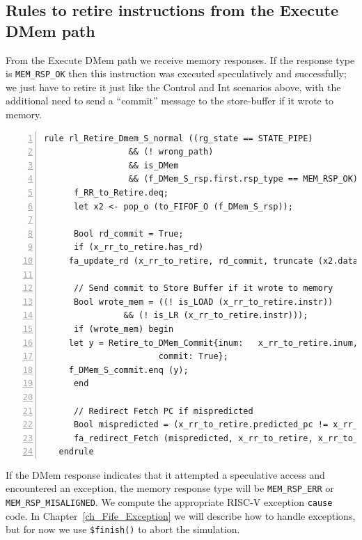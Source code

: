 
\subsection{Rules to retire instructions from the Execute DMem path}

From the Execute DMem path we receive memory responses.  If the
response type is \verb|MEM_RSP_OK| then this instruction was executed
speculatively and successfully; we just have to retire it just like
the Control and Int scenarios above, with the additional need to send
a ``commit'' message to the store-buffer if it wrote to memory.

{\small
\begin{Verbatim}[frame=single, numbers=left, label=(In file:src\_Fife/S5\_Retire.bsv)]
   rule rl_Retire_Dmem_S_normal ((rg_state == STATE_PIPE)
				 && (! wrong_path)
				 && is_DMem
				 && (f_DMem_S_rsp.first.rsp_type == MEM_RSP_OK));
      f_RR_to_Retire.deq;
      let x2 <- pop_o (to_FIFOF_O (f_DMem_S_rsp));

      Bool rd_commit = True;
      if (x_rr_to_retire.has_rd)
	 fa_update_rd (x_rr_to_retire, rd_commit, truncate (x2.data));

      // Send commit to Store Buffer if it wrote to memory
      Bool wrote_mem = ((! is_LOAD (x_rr_to_retire.instr))
		        && (! is_LR (x_rr_to_retire.instr)));
      if (wrote_mem) begin
	 let y = Retire_to_DMem_Commit{inum:   x_rr_to_retire.inum,
				       commit: True};
	 f_DMem_S_commit.enq (y);
      end

      // Redirect Fetch PC if mispredicted
      Bool mispredicted = (x_rr_to_retire.predicted_pc != x_rr_to_retire.fallthru_pc);
      fa_redirect_Fetch (mispredicted, x_rr_to_retire, x_rr_to_retire.fallthru_pc);
   endrule
\end{Verbatim}
}

If the DMem response indicates that it attempted a speculative access
and encountered an exception, the memory response type will be
\verb|MEM_RSP_ERR| or \verb|MEM_RSP_MISALIGNED|.  We compute the
appropriate RISC-V exception \verb|cause| code.  In
Chapter~\ref{ch_Fife_Exception} we will describe how to handle
exceptions, but for now we use \verb|$finish()| to abort the
simulation.

